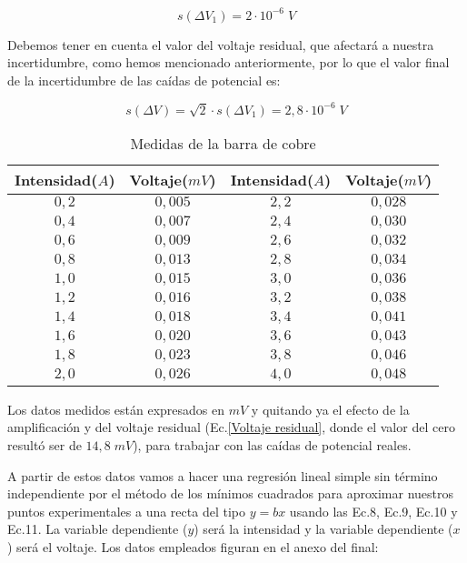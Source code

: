 \documentclass[a4paper,12pt,titlepage]{article}
\begin{document}
\begin{equation}
    s(\Delta V_{1}) = 2 \cdot 10^{-6}\; V
\end{equation}

Debemos tener en cuenta el valor del voltaje residual, que afectará a nuestra incertidumbre, como hemos mencionado anteriormente, por lo que el valor final de la incertidumbre de las caídas de potencial es:

\begin{equation}
    s(\Delta V) = \sqrt{2}\cdot s(\Delta V_{1}) = 2,8 \cdot 10^{-6} \; V
\end{equation}



\bigskip

\begin{table}[h!]
    \centering
    \begin{tabular}{|c|c|c|c|}
        \hline Intensidad($A$) & Voltaje($mV$) & Intensidad($A$) & Voltaje($mV$) \\
        \hline
        $0,2$ & $0,005$ & $2,2$ & $0,028$\\
        \hline
        $0,4$ & $0,007$ & $2,4$ & $0,030$  \\
        \hline
        $0,6$ & $0,009$ & $2,6$ & $0,032$  \\
        \hline
        $0,8$ & $0,013$ & $2,8$ & $0,034$  \\
        \hline
        $1,0$ & $0,015$ & $3,0$ & $0,036$  \\
        \hline
        $1,2$ & $0,016$ & $3,2$ & $0,038$  \\
        \hline
        $1,4$ & $0,018$ & $3,4$ & $0,041$  \\
        \hline
        $1,6$ & $0,020$ & $3,6$ & $0,043$  \\
        \hline
        $1,8$ & $0,023$ & $3,8$ & $0,046$  \\
        \hline
        $2,0$ & $0,026$ & $4,0$ & $0,048$  \\
        \hline
    \end{tabular}
    \caption{Medidas de la barra de cobre}
\end{table}

Los datos medidos están expresados en $mV$ y quitando ya el efecto de la amplificación y del voltaje residual (Ec.\ref{Voltaje residual}, donde el valor del cero resultó ser de $14,8 \; mV$), para trabajar con las caídas de potencial reales.

\par A partir de estos datos vamos a hacer una regresión lineal simple sin término independiente por el método de los mínimos cuadrados para aproximar nuestros puntos experimentales a una recta del tipo $y=bx$ usando las Ec.8, Ec.9, Ec.10 y Ec.11. La variable dependiente ($y$) será la intensidad y la variable dependiente ($x$) será el voltaje. Los datos empleados figuran en el anexo del final:
\end{document}
